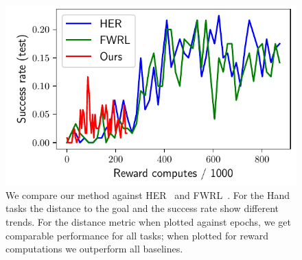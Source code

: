 \begin{figure}
  \includegraphics[width=\frac\columnwidth]{media/res/6efc1de-path_reward_low_thresh_chosen-HandManipulatePenRotate-v0-ddpg/reward_computes-test/success_rate.pdf}
  \caption{We compare our method against HER~\citep{andrychowicz2016learning}
    and FWRL~\citep{dhiman2018floydwarshall}.
For the Hand tasks the distance to the goal and the success rate show different trends.
For the distance metric when plotted against epochs, we get comparable
performance for all tasks; when plotted for reward computations we outperform
all baselines.
}%
  \label{fig:path-reward-hand}%
\end{figure}%
% 
